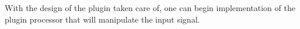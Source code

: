 



%

With the design of the plugin taken care of, one can begin implementation of the plugin processor that will manipulate the input signal.

